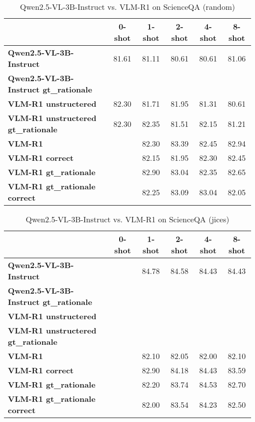 \begin{table}
\caption{Qwen2.5-VL-3B-Instruct vs. VLM-R1 on ScienceQA (random)}
\label{tab:Qwen2.5-VL-3B-Instruct_ScienceQA_TRAIN_random}
\begin{tabular}{lccccc}
\toprule
 & 0-shot & 1-shot & 2-shot & 4-shot & 8-shot \\
\midrule
\textbf{Qwen2.5-VL-3B-Instruct} & 81.61 & 81.11 & 80.61 & 80.61 & 81.06 \\
\textbf{Qwen2.5-VL-3B-Instruct gt\_rationale} &  &  &  &  &  \\
\textbf{VLM-R1 unstructered} & 82.30 & 81.71 & 81.95 & 81.31 & 80.61 \\
\textbf{VLM-R1 unstructered gt\_rationale} & 82.30 & 82.35 & 81.51 & 82.15 & 81.21 \\
\textbf{VLM-R1} &  & 82.30 & 83.39 & 82.45 & 82.94 \\
\textbf{VLM-R1 correct} &  & 82.15 & 81.95 & 82.30 & 82.45 \\
\textbf{VLM-R1 gt\_rationale} &  & 82.90 & 83.04 & 82.35 & 82.65 \\
\textbf{VLM-R1 gt\_rationale correct} &  & 82.25 & 83.09 & 83.04 & 82.05 \\
\bottomrule
\end{tabular}
\end{table}


\begin{table}
\caption{Qwen2.5-VL-3B-Instruct vs. VLM-R1 on ScienceQA (jices)}
\label{tab:Qwen2.5-VL-3B-Instruct_ScienceQA_TRAIN_jices}
\begin{tabular}{lccccc}
\toprule
 & 0-shot & 1-shot & 2-shot & 4-shot & 8-shot \\
\midrule
\textbf{Qwen2.5-VL-3B-Instruct} &  & 84.78 & 84.58 & 84.43 & 84.43 \\
\textbf{Qwen2.5-VL-3B-Instruct gt\_rationale} &  &  &  &  &  \\
\textbf{VLM-R1 unstructered} &  &  &  &  &  \\
\textbf{VLM-R1 unstructered gt\_rationale} &  &  &  &  &  \\
\textbf{VLM-R1} &  & 82.10 & 82.05 & 82.00 & 82.10 \\
\textbf{VLM-R1 correct} &  & 82.90 & 84.18 & 84.43 & 83.59 \\
\textbf{VLM-R1 gt\_rationale} &  & 82.20 & 83.74 & 84.53 & 82.70 \\
\textbf{VLM-R1 gt\_rationale correct} &  & 82.00 & 83.54 & 84.23 & 82.50 \\
\bottomrule
\end{tabular}
\end{table}


